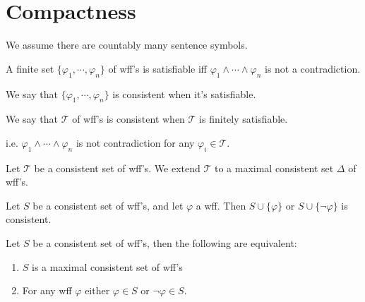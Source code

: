 \documentclass[11pt]{article}
\begin{document}
	\section{Compactness}
	We assume there are countably many sentence symbols.
	
	A finite set $\{\varphi_1, \cdots, \varphi_n\}$ of wff's is satisfiable iff $\varphi_1 \wedge \cdots \wedge \varphi_n$ is not a contradiction.
	
	We say that $\{\varphi_1, \cdots, \varphi_n\}$ is consistent when it's satisfiable.
	
	We say that $\mathcal{T}$ of wff's is consistent when $\mathcal{T}$ is finitely satisfiable.
	
	i.e. $\varphi_1 \wedge \cdots \wedge \varphi_n$ is not contradiction for any $\varphi_i \in \mathcal{T}$.
	
	Let $\mathcal{T}$ be a consistent set of wff's. We extend $\mathcal{T}$ to a maximal consistent set $\Delta$ of wff's.
	
	\begin{lemma}
		Let $S$ be a consistent set of wff's, and let $\varphi$ a wff. Then $S \cup \{\varphi\}$ or $S \cup \{\neg\varphi\}$ is consistent.
	\end{lemma}
	
	\begin{lemma}
		Let $S$ be a consistent set of wff's, then the following are equivalent:
		\begin{enumerate}
			\item $S$ is a maximal consistent set of wff's
			\item For any wff $\varphi$ either $\varphi \in S$ or $\neg\varphi \in S$.
		\end{enumerate}
	\end{lemma}
\end{document}
